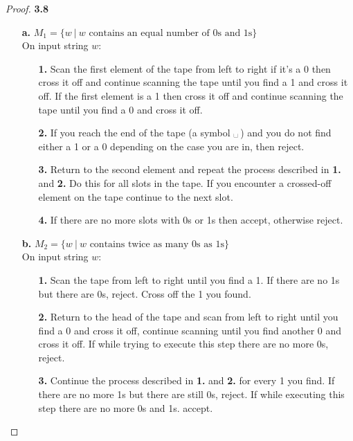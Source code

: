 \documentclass[11pt]{article}
\newcommand{\esp}{\text{\textvisiblespace}\hspace{0.1em}}
\theoremstyle{definition}
\begin{document}
\cleardoublepage
\begin{proof}{\textbf{3.8}}
\begin{itemize}
    \item [\textbf{a.}]
    $M_1 = \{w~|~w \text{ contains an equal number of 0s and 1s}\}$\\
    On input string $w$:
    \begin{itemize}
        \item [\textbf{1.}] Scan the first element of the tape from left to
        right if it's a 0 then cross it off and continue scanning the tape
        until you find a 1 and cross it off. If the first element is a 1 then
        cross it off and continue scanning the tape until you find a 0 and
        cross it off.
        \item [\textbf{2.}] If you reach the end of the tape (a symbol $\esp$)
        and you do not find either a 1 or a 0 depending on the case you are
        in, then reject.
        \item [\textbf{3.}] Return to the second element and repeat the process
        described in \textbf{1.} and \textbf{2.}
        Do this for all slots in the tape.
        If you encounter a crossed-off element on the tape continue to the
        next slot.
        \item [\textbf{4.}] If there are no more slots with 0s or 1s then
        accept, otherwise reject.
    \end{itemize}
    \item [\textbf{b.}]
    $M_2 = \{w~|~w \text{ contains twice as many 0s as 1s}\}$\\
    On input string $w$:
    \begin{itemize}
        \item [\textbf{1.}] Scan the tape from left to right until you find a 1.
        If there are no 1s but there are 0s, reject. Cross off the 1 you found.
        \item [\textbf{2.}] Return to the head of the tape and scan from left
        to right until you find a 0 and cross it off, continue scanning until
        you find another 0 and cross it off. If while trying to execute this
        step there are no more 0s, reject.
        \item [\textbf{3.}] Continue the process described in \textbf{1.} and
        \textbf{2.} for every 1 you find. If there are no more 1s but there are
        still 0s, reject. If while executing this step there are no more 0s and
        1s. accept.
    \end{itemize}

\end{itemize}
\end{proof}
\end{document}
